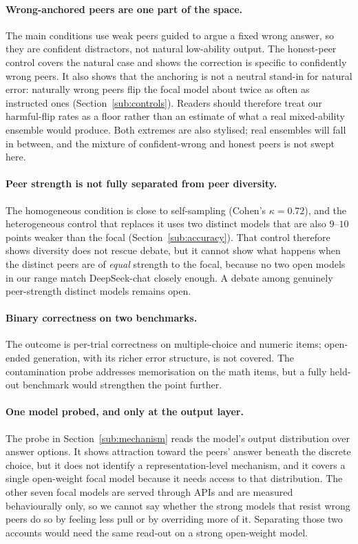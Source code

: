 \documentclass[11pt]{article}
\begin{document}
\paragraph{Wrong-anchored peers are one part of the space.}
The main conditions use weak peers guided to argue a fixed wrong answer, so
they are confident distractors, not natural low-ability output.
The honest-peer control covers the natural case and shows the correction is
specific to confidently wrong peers.
It also shows that the anchoring is not a neutral stand-in for natural error:
naturally wrong peers flip the focal model about twice as often as instructed
ones (Section~\ref{sub:controls}).
Readers should therefore treat our harmful-flip rates as a floor rather than an
estimate of what a real mixed-ability ensemble would produce.
Both extremes are also stylised; real ensembles will fall in between, and the
mixture of confident-wrong and honest peers is not swept here.

\paragraph{Peer strength is not fully separated from peer diversity.}
The homogeneous condition is close to self-sampling (Cohen's
$\kappa = 0.72$), and the heterogeneous control that replaces it uses two
distinct models that are also $9$--$10$ points weaker than the focal
(Section~\ref{sub:accuracy}).
That control therefore shows diversity does not rescue debate, but it cannot
show what happens when the distinct peers are of \emph{equal} strength to the
focal, because no two open models in our range match DeepSeek-chat closely
enough.
A debate among genuinely peer-strength distinct models remains open.

\paragraph{Binary correctness on two benchmarks.}
The outcome is per-trial correctness on multiple-choice and numeric items;
open-ended generation, with its richer error structure, is not covered.
The contamination probe addresses memorisation on the math items, but a
fully held-out benchmark would strengthen the point further.

\paragraph{One model probed, and only at the output layer.}
The probe in Section~\ref{sub:mechanism} reads the model's output
distribution over answer options. It shows attraction toward the peers'
answer beneath the discrete choice, but it does not identify a
representation-level mechanism, and it covers a single open-weight focal
model because it needs access to that distribution.
The other seven focal models are served through APIs and are measured
behaviourally only, so we cannot say whether the strong models that resist
wrong peers do so by feeling less pull or by overriding more of it.
Separating those two accounts would need the same read-out on a strong
open-weight model.
\end{document}
